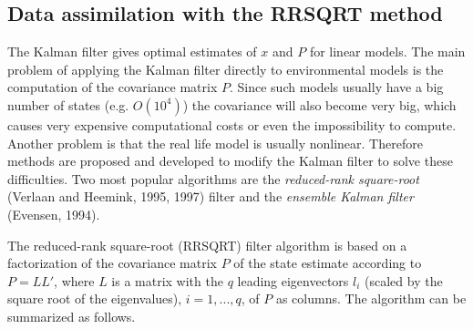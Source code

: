 \documentclass[a4paper,12pt]{article}
\begin{document}
\subsection{Data assimilation  with the RRSQRT method}

      The Kalman filter gives optimal estimates of $x$ and $P$ for linear models.
      The main problem of applying the Kalman filter directly to environmental
      models is the computation of the covariance matrix $P$. Since such models
      usually have a big number of states (e.g. $O(10^4)$) the covariance will
      also become very big, which causes very expensive computational costs or
      even the impossibility to compute. Another problem is that the real life model is
      usually nonlinear. Therefore methods are proposed and developed to modify
      the Kalman filter to solve these difficulties. Two most popular
      algorithms are the \emph{reduced-rank square-root} (Verlaan and Heemink,
      1995, 1997) filter and the \emph{ensemble Kalman filter} (Evensen, 1994).

      The reduced-rank square-root (RRSQRT) filter algorithm is based on a
      factorization of the covariance matrix $P$ of the state estimate
      according to $P=LL'$, where $L$ is a matrix with the $q$ leading
      eigenvectors $l_i$ (scaled by the square root of the eigenvalues),
      $i=1,...,q$, of $P$ as columns. The algorithm can be summarized as
      follows.
\end{document}
